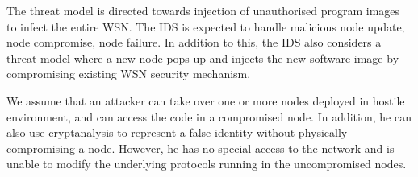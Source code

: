 \documentclass[conference,manuscript]{IEEEtran}
\newcommand{\notedme}[1]{\raisebox{0pt}[0pt][0pt]{\pdfcomment[open=true,color=blue]{#1}}}
\begin{document}
The threat model is directed towards injection of unauthorised program images to infect the entire WSN.
The IDS is expected to handle malicious node update, node compromise, node failure.
In addition to this, the IDS also considers a threat model where a new node pops up and injects the new software image by compromising existing WSN security mechanism.

We assume that an  attacker  can take over one or more nodes deployed in hostile environment, and can access the code in a compromised node. 
In addition, he can also use cryptanalysis to represent a false identity without physically compromising a node.
However, he has  no special  access to  the  network and is unable to modify the underlying protocols running in the uncompromised nodes.
\end{document}
